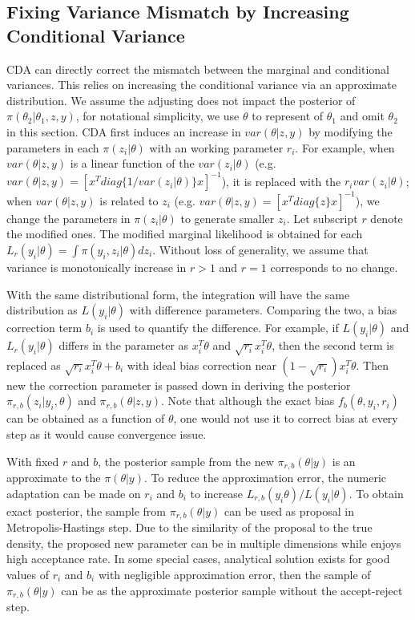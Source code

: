 \documentclass[10pt]{article}
\begin{document}
\subsection{Fixing Variance Mismatch by Increasing Conditional Variance}

CDA can directly correct the mismatch between the marginal and conditional variances. This relies on increasing the conditional variance via an approximate distribution. We assume the adjusting does not impact the posterior of $\pi(\theta_2|\theta_1,z,y)$, for notational simplicity, we use $\theta$ to represent of $\theta_1$ and omit $\theta_2$ in this section. CDA first induces an increase in $var(\theta|z,y)$ by modifying the parameters in each $\pi(z_i|\theta)$ with an working parameter $r_i$. For example,  when $var(\theta|z,y)$ is a linear function of the $var(z_i|\theta)$ (e.g. $var(\theta|z,y)= [ x^{T} diag \{ 1/ var(z_i|\theta)\}x ]^{-1}$), it is replaced with the $r_i  var(z_i|\theta)$; when $var(\theta|z,y)$ is related to $z_i$  (e.g.  $var(\theta|z,y)= [ x^{T} diag \{z\}x ]^{-1}$), we change the parameters in $\pi(z_i|\theta)$ to generate smaller $z_i$. Let subscript $r$ denote the modified ones. The modified marginal likelihood is obtained for each $L_r(y_i|\theta)= \int \pi(y_i, z_i | \theta) d z_i$. Without loss of generality, we assume that variance is monotonically increase in $r>1$ and $r=1$ corresponds to no change. 

With the same distributional form, the integration will have the same distribution as $L(y_i|\theta)$ with difference parameters. Comparing the two, a bias correction term $b_i$ is used to quantify the difference. For example, if $L(y_i|\theta)$ and $L_r(y_i|\theta)$ differs in the parameter as $x_i^T\theta$ and  $\sqrt{r_i} x_i^T\theta$, then the second term is replaced as $\sqrt{r_i} x_i^T\theta+ b_i$ with  ideal bias correction  near $(1-\sqrt{r_i}) x_i^T\theta$. Then new the correction parameter is passed down in deriving the posterior $\pi_{r,b}( z_i | y_i, \theta )$ and $\pi_{r,b}( \theta |z,y)$.  Note that although the exact bias $f_b(\theta,y_i, r_i)$ can be obtained as a function of $\theta$, one would not use it to correct bias at every step as it would cause convergence issue.

With fixed $r$ and $b$, the posterior sample from the new $\pi_{r,b}(\theta|y)$ is an approximate to the $\pi(\theta|y)$. To reduce the approximation error, the numeric adaptation can be made on $r_i$ and $b_i$ to increase $L_{r,b}(y_i\theta)/L(y_i|\theta)$. To obtain exact posterior, the sample from $\pi_{r,b}(\theta|y)$ can be used as proposal in Metropolis-Hastings step. Due to the similarity of the proposal to the true density, the proposed new parameter can be in multiple dimensions while enjoys high acceptance rate. In some special cases, analytical solution exists for good values of $r_i$ and $b_i$ with negligible approximation error, then the sample of $\pi_{r,b}(\theta|y)$ can be as the approximate posterior sample without the accept-reject step.
\end{document}
